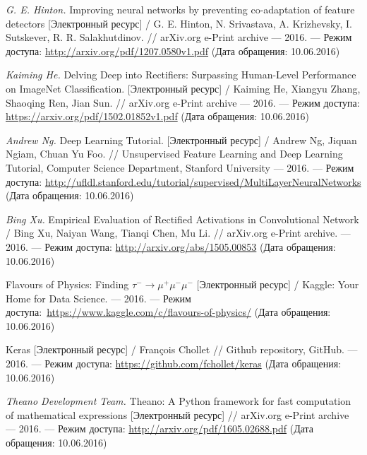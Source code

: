 \documentclass[14pt, a4paper]{extarticle}
\begin{document}
\begin{thebibliography}{3}
\textit{G. E. Hinton.} Improving neural networks by preventing
co-adaptation of feature detectors [Электронный ресурс] / G. E. Hinton, N. Srivastava, A. Krizhevsky, I. Sutskever, R. R. Salakhutdinov. // arXiv.org e-Print archive — 2016. — Режим доступа: \url{http://arxiv.org/pdf/1207.0580v1.pdf} (Дата обращения: 10.06.2016)

\textit{Kaiming He.} Delving Deep into Rectifiers:
Surpassing Human-Level Performance on ImageNet Classification. [Электронный ресурс] / Kaiming He, Xiangyu Zhang, Shaoqing Ren, Jian Sun. // arXiv.org e-Print archive — 2016. — Режим доступа: \url{https://arxiv.org/pdf/1502.01852v1.pdf}  (Дата обращения: 10.06.2016)

\textit{Andrew Ng.} Deep Learning Tutorial. [Электронный ресурс] / Andrew Ng, Jiquan Ngiam, Chuan Yu Foo. //
Unsupervised Feature Learning and Deep Learning Tutorial, Computer Science Department, Stanford University — 2016. — Режим доступа: \url{http://ufldl.stanford.edu/tutorial/supervised/MultiLayerNeuralNetworks} (Дата обращения: 10.06.2016)

\textit{Bing Xu.} Empirical Evaluation of Rectified Activations in Convolutional Network / Bing Xu, Naiyan Wang, Tianqi Chen, Mu Li. // arXiv.org e-Print archive. — 2016. — Режим доступа: \url{http://arxiv.org/abs/1505.00853} (Дата обращения: 10.06.2016)

 Flavours of Physics: Finding $\tau^-\rightarrow\mu^+ \mu^- \mu^-$ [Электронный ресурс] / Kaggle: Your Home for Data Science. — 2016. — Режим доступа: \url{https://www.kaggle.com/c/flavours-of-physics/} (Дата обращения: 10.06.2016)

Keras [Электронный ресурс] / François Chollet // Github repository, GitHub. —  2016. — Режим доступа: \url{https://github.com/fchollet/keras} (Дата обращения: 10.06.2016)

\textit{Theano Development Team.} Theano: A Python framework for fast computation of mathematical expressions [Электронный ресурс] // arXiv.org e-Print archive — 2016. — Режим доступа: \url{http://arxiv.org/pdf/1605.02688.pdf} (Дата обращения: 10.06.2016)

\end{thebibliography}

\label{page:last}
\end{document}
